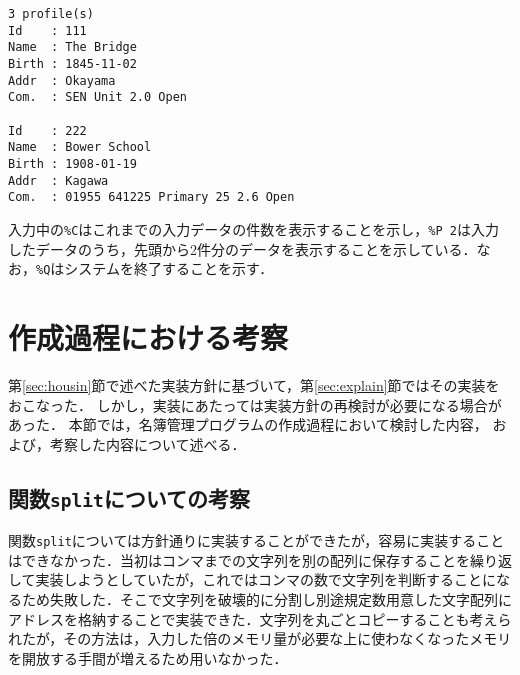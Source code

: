 \documentclass[a4j,11pt]{jarticle}
\begin{document}
{\fontsize{10pt}{11pt} \selectfont
 \begin{verbatim}
3 profile(s)
Id    : 111
Name  : The Bridge
Birth : 1845-11-02
Addr  : Okayama
Com.  : SEN Unit 2.0 Open

Id    : 222
Name  : Bower School
Birth : 1908-01-19
Addr  : Kagawa
Com.  : 01955 641225 Primary 25 2.6 Open

 \end{verbatim}
}

\noindent
入力中の\verb|%C|はこれまでの入力データの件数を表示することを示し，\verb|%P 2|は入力したデータのうち，先頭から2件分のデータを表示することを示している．なお，\verb|%Q|はシステムを終了することを示す．

\section{作成過程における考察}


第\ref{sec:housin}節で述べた実装方針に基づいて，第\ref{sec:explain}節ではその実装をおこなった．
しかし，実装にあたっては実装方針の再検討が必要になる場合があった．
本節では，名簿管理プログラムの作成過程において検討した内容，
および，考察した内容について述べる．

\subsection{関数\texttt{split}についての考察}

関数\verb|split|については方針通りに実装することができたが，容易に実装することはできなかった．当初はコンマまでの文字列を別の配列に保存することを繰り返して実装しようとしていたが，これではコンマの数で文字列を判断することになるため失敗した．そこで文字列を破壊的に分割し別途規定数用意した文字配列にアドレスを格納することで実装できた．文字列を丸ごとコピーすることも考えられたが，その方法は，入力した倍のメモリ量が必要な上に使わなくなったメモリを開放する手間が増えるため用いなかった．
\end{document}
